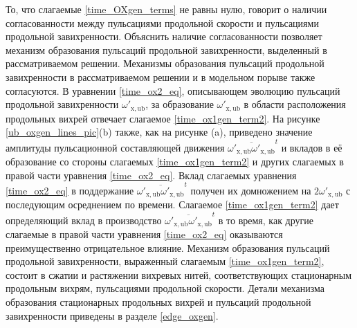 То, что слагаемые \eqref{time_OXgen_terms} не равны нулю, говорит о наличии согласованности между пульсациями продольной скорости и пульсациями продольной завихренности. Объяснить наличие согласованности позволяет механизм образования пульсаций продольной завихренности, выделенный в рассматриваемом решении. Механизмы образования пульсаций продольной завихренности в рассматриваемом решении и в модельном порыве также согласуются. В уравнении \eqref{time_ox2_eq}, описывающем эволюцию пульсаций продольной завихренности $\omega'_\mathrm{x,ub}$, за образование $\omega'_\mathrm{x,ub}$ в области расположения продольных вихрей отвечает слагаемое \eqref{time_ox1gen_term2}. На рисунке \ref{ub_oxgen_lines_pic}(b) также, как на рисунке (a), приведено значение амплитуды пульсационной составляющей движения $\overline{\omega'_\mathrm{x,ub}\omega'_\mathrm{x,ub}}^t$ и вкладов в её образование со стороны слагаемых \eqref{time_ox1gen_term2} и других слагаемых в правой части уравнения \eqref{time_ox2_eq}. Вклад слагаемых уравнения \eqref{time_ox2_eq} в поддержание $\overline{\omega'_\mathrm{x,ub}\omega'_\mathrm{x,ub}}^t$ получен их домножением на $2\omega'_\mathrm{x,ub}$ с последующим осреднением по времени. Слагаемое \eqref{time_ox1gen_term2} дает определяющий вклад в производство  $\overline{\omega'_\mathrm{x,ub}\omega'_\mathrm{x,ub}}^t$ в то время, как другие слагаемые в правой части уравнения \eqref{time_ox2_eq} оказываются преимущественно отрицательное влияние. Механизм образования пульсаций продольной завихренности, выраженный слагаемым \eqref{time_ox1gen_term2}, состоит в сжатии и растяжении вихревых нитей, соответствующих стационарным продольным вихрям, пульсациями продольной скорости. Детали механизма образования стационарных продольных вихрей и пульсаций продольной завихренности приведены в разделе \ref{edge_oxgen}.

